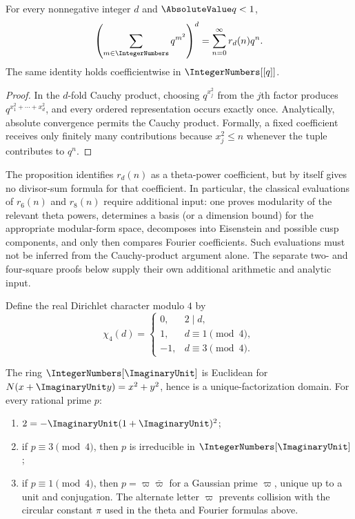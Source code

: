 \begin{proposition}
\label{qg:prop-squares-theta}
For every nonnegative integer $d$ and $\AbsoluteValue q<1$,
\begin{equation}
 \left(\sum_{m\in\IntegerNumbers}q^{m^2}\right)^d
 =\sum_{n=0}^{\infty}r_d(n)q^n.
\label{eq:qg-squares-theta}
\end{equation}
The same identity holds coefficientwise in $\IntegerNumbers[[q]]$.
\end{proposition}

\begin{proof}
In the $d$-fold Cauchy product, choosing $q^{x_j^2}$ from the $j$th factor
produces $q^{x_1^2+\cdots+x_d^2}$, and every ordered representation occurs
exactly once.  Analytically, absolute convergence permits the Cauchy product.
Formally, a fixed coefficient receives only finitely many contributions because
$x_j^2\le n$ whenever the tuple contributes to $q^n$.
\end{proof}

\begin{warning}
The proposition identifies $r_d(n)$ as a theta-power coefficient, but by
itself gives no divisor-sum formula for that coefficient.  In particular, the
classical evaluations of $r_6(n)$ and $r_8(n)$ require additional input:
one proves modularity of the relevant theta powers, determines a basis (or a
dimension bound) for the appropriate modular-form space, decomposes into
Eisenstein and possible cusp components, and only then compares Fourier
coefficients.  Such evaluations must not be inferred from the Cauchy-product
argument alone.  The separate two- and four-square proofs below supply their
own additional arithmetic and analytic input.
\end{warning}

Define the real Dirichlet character modulo $4$ by
\[
 \chi_4(d)=
 \begin{cases}
  0,&2\mid d,\\
  1,&d\equiv1\pmod4,\\
 -1,&d\equiv3\pmod4.
 \end{cases}
\]

\begin{lemma}
\label{qg:lem-gaussian-ufd}
The ring $\IntegerNumbers[\ImaginaryUnit]$ is Euclidean for
$N(x+\ImaginaryUnit y)=x^2+y^2$, hence is a unique-factorization domain.
For every rational prime $p$:
\begin{enumerate}[label=\textup{(\roman*)}]
\item $2=-\ImaginaryUnit(1+\ImaginaryUnit)^2$;
\item if $p\equiv3\pmod4$, then $p$ is irreducible in
      $\IntegerNumbers[\ImaginaryUnit]$;
\item if $p\equiv1\pmod4$, then $p=\varpi\bar\varpi$ for a Gaussian prime
      $\varpi$, unique up to a unit and conjugation.  The alternate letter
      $\varpi$ prevents collision with the circular constant $\pi$ used in
      the theta and Fourier formulas above.
\end{enumerate}
\end{lemma}

